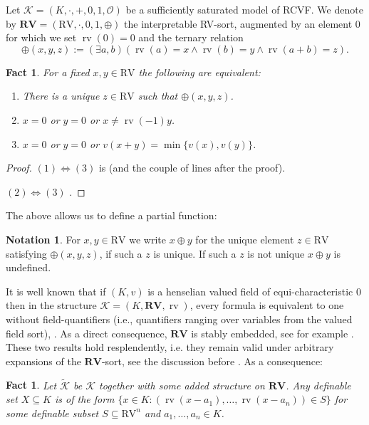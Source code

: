 \documentclass[11pt]{amsart}
\DeclareMathOperator{\rv}{rv}
\newtheorem{fact}[theorem]{Fact}
\theoremstyle{definition}
\newtheorem{notation}[theorem]{Notation}
\newcommand{\CK}{{\mathcal K}}
\newcommand{\CO}{{\mathcal O}}
\newcommand{\0}{\emptyset}
\begin{document}
Let $\CK=(K,\cdot,+,0,1,\CO)$ be a sufficiently saturated model of RCVF. We denote by $\mathbf{RV}=(\mathrm{RV},\cdot,0,1,\oplus)$ the interpretable RV-sort, augmented by an     element $0$ for which we set $\rv(0)=0$ and the ternary relation \[
\oplus(x,y,z):=(\exists a,b)(\rv(a)=x\land  \rv(b)=y\land \rv(a+b)=z).\] 

\begin{fact}\label{F:oplus defined}
    For a fixed $x,y\in \mathrm{RV}$ the following are equivalent:
    \begin{enumerate}
        \item There is a unique $z\in \mathrm{RV}$ such that $\oplus(x,y,z)$.
        \item $x=0$ or $y=0$ or $x\neq \rv(-1)y$.
        \item $x=0$ or $y=0$ or $v(x+y)=\min\{v(x),v(y)\}$.
    \end{enumerate}
\end{fact}
\begin{proof}
    $(1)\iff (3)$ is \cite[Proposition 2.4]{flenner} (and the couple of lines after the proof).

    $(2)\iff (3)$ \cite[Proposition 2.2]{flenner}.
\end{proof}

The above allows us to define a partial function: 
\begin{notation}
        For $x, y\in \mathrm{RV}$ we write $x\oplus y$ for the  unique element $z\in \mathrm{RV}$ satisfying $\oplus(x,y,z)$, if such a $z$ is unique. If such a $z$ is not unique $x\oplus y$ is undefined. 
\end{notation}

It is well known that if $(K,v)$ is a henselian valued field of equi-characteristic $0$  then in the structure $\CK=(K,\mathbf{RV},\rv)$, every formula is equivalent to one without field-quantifiers (i.e., quantifiers ranging over variables from the valued field sort), \cite[Proposition 4.3]{flenner}. As a direct consequence, $\mathbf{RV}$ is stably embedded, see for example \cite[Remark A.10]{Ri:analytic}. These two results hold resplendently, i.e. 
they remain valid under arbitrary expansions of the  $\mathbf{RV}$-sort, see the discussion before \cite[Proposition 4.3]{flenner}. As a consequence:

\begin{fact}\label{F:fieldQE-RV}\cite[Proposition 5.1]{flenner}
    Let $\widetilde{\CK}$ be $\CK$ together with some added structure on $\mathbf{RV}$.     Any definable set $X\subseteq K$ is of the form $\{x\in K: (\rv(x-a_1),\dots, \rv(x-a_n))\in S\}$ for some definable subset $S\subseteq \mathrm{RV}^n$ and $a_1,\dots,a_n\in K$.
\end{fact}
\end{document}
